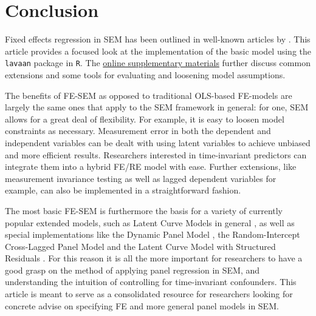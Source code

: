\documentclass[]{interact}
\theoremstyle{plain}%
\theoremstyle{definition}
\theoremstyle{remark}
\begin{document}
\hypertarget{conclusion}{%
\section{Conclusion}\label{conclusion}}

Fixed effects regression in SEM has been outlined in well-known articles
by \citep{Allison2011, Bollen2010, Teachman2001}. This article provides
a focused look at the implementation of the basic model using the
\texttt{lavaan} package in \texttt{R}. The
\href{https://github.com/henrik-andersen/FE-SEM/blob/master/extensions.pdf}{online
supplementary materials} further discuss common extensions and some
tools for evaluating and loosening model assumptions.

The benefits of FE-SEM as opposed to traditional OLS-based FE-models are
largely the same ones that apply to the SEM framework in general: for
one, SEM allows for a great deal of flexibility. For example, it is easy
to loosen model constraints as necessary. Measurement error in both the
dependent and independent variables can be dealt with using latent
variables to achieve unbiased and more efficient results. Researchers
interested in time-invariant predictors can integrate them into a hybrid
FE/RE model with ease. Further extensions, like measurement invariance
testing \citep{Schoot2012, Millsap2011, Steenkamp1998} as well as lagged
dependent variables \citep{Bollen2010, Allison2017} for example, can
also be implemented in a straightforward fashion.

The most basic FE-SEM is furthermore the basis for a variety of
currently popular extended models, such as Latent Curve Models in
general \citep{Curran2001, Bollen2004}, as well as special
implementations like the Dynamic Panel Model \citep{Allison2017}, the
Random-Intercept Cross-Lagged Panel Model \citep{Hamaker2015} and the
Latent Curve Model with Structured Residuals \citep{Curran2014}. For
this reason it is all the more important for researchers to have a good
grasp on the method of applying panel regression in SEM, and
understanding the intuition of controlling for time-invariant
confounders. This article is meant to serve as a consolidated resource
for researchers looking for concrete advise on specifying FE and more
general panel models in SEM.



\end{document}
